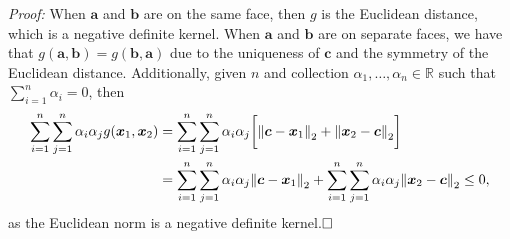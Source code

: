 {\em Proof:}
When $\bm{a}$ and $\bm{b}$ are on the same face, then $g$ is the Euclidean distance, which is a 
  negative definite kernel.  When $\bm{a}$ and $\bm{b}$ are on separate
  faces, we have that $g(\bm{a}, \bm{b}) = g(\bm{b}, \bm{a})$ due to the uniqueness of $\bm{c}$ and the symmetry of the Euclidean distance. Additionally, given $n$ and  collection $\alpha_1,\ldots,\alpha_n\in{\mathbb R}$ such that  $\sum_{i = 1}^n\alpha_i = 0$, then
  \begin{equation*}
    \begin{aligned}
      \sum_{i = 1}^n\sum_{j = 1}^n \alpha_i\alpha_j g(\bm{x}_1,\bm{x}_2) &= \sum_{i = 1}^n\sum_{j = 1}^n \alpha_i\alpha_j \bigg[\pnorm{\bm{c} - \bm{x}_1}{2} + \pnorm{\bm{x}_2 - \bm{c}}{2}\bigg]\\
      &= \sum_{i = 1}^n\sum_{j = 1}^n \alpha_i\alpha_j\pnorm{\bm{c} - \bm{x}_1}{2} + \sum_{i = 1}^n\sum_{j = 1}^n \alpha_i\alpha_j\pnorm{\bm{x}_2 - \bm{c}}{2} \leq0,
    \end{aligned}
  \end{equation*}
  as the Euclidean norm is a negative definite kernel.$\hfill\Box$
 
